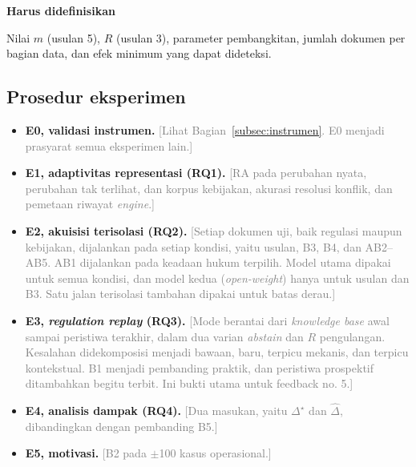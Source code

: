 \documentclass[journal,a4paper]{IEEEtran}
\newcommand{\en}[1]{\textit{#1}}
\newcommand{\emas}{\star}
\newif\ifrancangan \rancangantrue
\newcommand{\kotak}[3]{\ifrancangan\par\begingroup\scriptsize
  \def\FrameCommand{\fboxsep=3pt\fboxrule=0.4pt\fcolorbox{#1!60!black}{#1!6}}%
  \MakeFramed{\advance\hsize-\width\FrameRestore}\noindent\textbf{#2}\par #3\endMakeFramed\endgroup\fi}
\newcommand{\definisikan}[1]{\kotak{teal}{Harus didefinisikan}{#1}}
\newcommand{\isian}[1]{\ifrancangan\textcolor{gray}{[#1]}\fi}
\begin{document}
\definisikan{Nilai $m$ (usulan 5), $R$ (usulan 3), parameter pembangkitan, jumlah dokumen per bagian data, dan efek minimum yang dapat dideteksi.}

\subsection{Prosedur eksperimen}
\begin{itemize}[leftmargin=*,nosep]
  \item \textbf{E0, validasi instrumen.} \isian{Lihat Bagian~\ref{subsec:instrumen}. E0 menjadi prasyarat semua eksperimen lain.}
  \item \textbf{E1, adaptivitas representasi (RQ1).} \isian{RA pada perubahan nyata, perubahan tak terlihat, dan korpus kebijakan, akurasi resolusi konflik, dan pemetaan riwayat \en{engine}.}
  \item \textbf{E2, akuisisi terisolasi (RQ2).} \isian{Setiap dokumen uji, baik regulasi maupun kebijakan, dijalankan pada setiap kondisi, yaitu usulan, B3, B4, dan AB2--AB5. AB1 dijalankan pada keadaan hukum terpilih. Model utama dipakai untuk semua kondisi, dan model kedua (\en{open-weight}) hanya untuk usulan dan B3. Satu jalan terisolasi tambahan dipakai untuk batas derau.}
  \item \textbf{E3, \en{regulation replay} (RQ3).} \isian{Mode berantai dari \en{knowledge base} awal sampai peristiwa terakhir, dalam dua varian \en{abstain} dan $R$ pengulangan. Kesalahan didekomposisi menjadi bawaan, baru, terpicu mekanis, dan terpicu kontekstual. B1 menjadi pembanding praktik, dan peristiwa prospektif ditambahkan begitu terbit. Ini bukti utama untuk feedback no. 5.}
  \item \textbf{E4, analisis dampak (RQ4).} \isian{Dua masukan, yaitu $\Delta^{\emas}$ dan $\hat{\Delta}$, dibandingkan dengan pembanding B5.}
  \item \textbf{E5, motivasi.} \isian{B2 pada $\pm$100 kasus operasional.}
\end{itemize}
\end{document}

